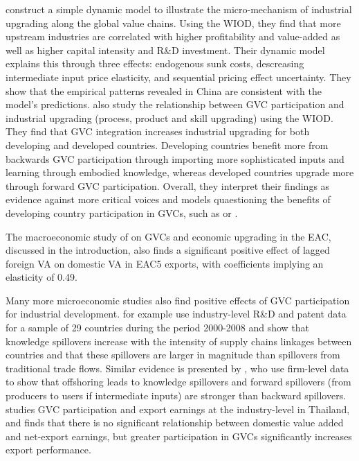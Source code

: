 \documentclass[a4paper]{article}
\begin{document}
\citet{shen2021towards} construct a simple dynamic model to illustrate the micro-mechanism of industrial upgrading along the global value chains. Using the WIOD, they find that more upstream industries are correlated with higher profitability and value-added as well as higher capital intensity and R\&D investment. Their dynamic model explains this through three effects: endogenous sunk costs, descreasing intermediate input price elasticity, and sequential pricing effect uncertainty. They show that the empirical patterns revealed in China are consistent with the model's predictions. \citet{tian2022global} also study the relationship between GVC participation and industrial upgrading (process, product and skill upgrading) using the WIOD. They find that GVC integration increases industrial upgrading for both developing and developed countries. Developing countries benefit more from backwards GVC participation through importing more sophisticated inputs and learning through embodied knowledge, whereas developed countries upgrade more through forward GVC participation. Overall, they interpret their findings as evidence against more critical voices and models quaestioning the benefits of developing country participation in GVCs, such as \citet{baldwin2014trade} or \citet{dalle2013industrial}. \newline

The macroeconomic study of \citet{lwesya2022integration} on GVCs and economic upgrading in the EAC, discussed in the introduction, also finds a significant positive effect of lagged foreign VA on domestic VA in EAC5 exports, with coefficients implying an elasticity of 0.49. \newline 

Many more microeconomic studies also find positive effects of GVC participation for industrial development. \citet{piermartini2014knowledge} for example use industry-level R\&D and patent data for a sample of 29 countries during the period 2000-2008 and show that knowledge spillovers increase with the intensity of supply chains linkages between countries and that these spillovers are larger in magnitude than spillovers from traditional trade flows. Similar evidence is presented by \citet{benz2015trade}, who use firm-level data to show that offshoring leads to knowledge spillovers and forward spillovers (from producers to users if intermediate inputs) are stronger than backward spillovers. \citet{durongkaveroj2023emphasis} studies GVC participation and export earnings at the industry-level in Thailand, and finds that there is no significant relationship between domestic value added and net-export earnings, but greater participation in GVCs significantly increases export performance. \newline
\end{document}
